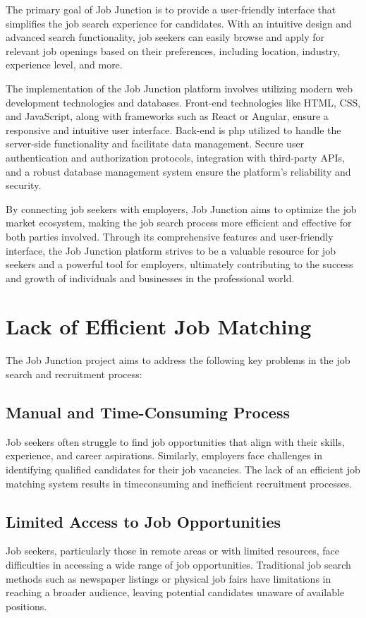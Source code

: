 \documentclass[a4paper,11pt]{report}
\begin{document}
The primary goal of Job Junction is to provide a user-friendly interface that simplifies the job search
experience for candidates. With an intuitive design and advanced search functionality, job seekers can
easily browse and apply for relevant job openings based on their preferences, including location,
industry, experience level, and more. 

The implementation of the Job Junction platform involves utilizing modern web development
technologies and databases. Front-end technologies like HTML, CSS, and JavaScript, along with
frameworks such as React or Angular, ensure a responsive and intuitive user interface. Back-end is php
utilized to handle the server-side functionality and facilitate data management. Secure user
authentication and authorization protocols, integration with third-party APIs, and a robust database
management system ensure the platform's reliability and security.


By connecting job seekers with employers, Job Junction aims to optimize the job market ecosystem,
making the job search process more efficient and effective for both parties involved. Through its
comprehensive features and user-friendly interface, the Job Junction platform strives to be a valuable
resource for job seekers and a powerful tool for employers, ultimately contributing to the success and
growth of individuals and businesses in the professional world.

  
\chapter{Lack of Efficient Job Matching}
The Job Junction project aims to address the following key problems in the job search and recruitment
process:

\section{Manual and Time-Consuming Process}
 Job seekers often struggle to find job opportunities that align with
their skills, experience, and career aspirations. Similarly, employers face challenges in identifying
qualified candidates for their job vacancies. The lack of an efficient job matching system results in timeconsuming and inefficient recruitment processes.
\section{Limited Access to Job Opportunities}
 Job seekers, particularly those in remote areas or with limited
resources, face difficulties in accessing a wide range of job opportunities. Traditional job search methods
such as newspaper listings or physical job fairs have limitations in reaching a broader audience, leaving
potential candidates unaware of available positions.
\end{document}
